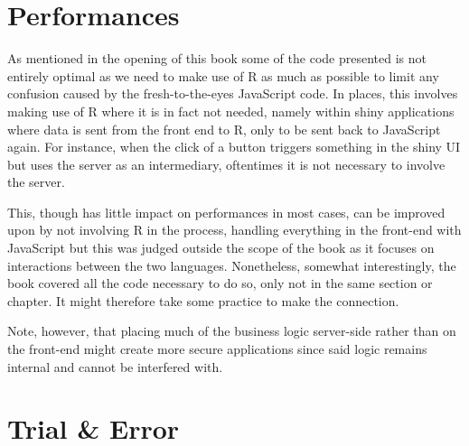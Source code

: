 \documentclass[
]{krantz}
\makeatletter
\newenvironment{Shaded}{\begin{snugshade}}{\end{snugshade}}
\newcommand{\AttributeTok}[1]{\textcolor[rgb]{0.61,0.61,0.61}{#1}}
\newcommand{\CommentTok}[1]{\textcolor[rgb]{0.37,0.37,0.37}{\textit{#1}}}
\newcommand{\KeywordTok}[1]{\textcolor[rgb]{0.27,0.27,0.27}{\textbf{#1}}}
\newcommand{\NormalTok}[1]{#1}
\newcommand{\OperatorTok}[1]{\textcolor[rgb]{0.43,0.43,0.43}{\textbf{#1}}}
\newcommand{\StringTok}[1]{\textcolor[rgb]{0.5,0.5,0.5}{#1}}
\newenvironment{kframe}{%
\medskip{}
\setlength{\fboxsep}{.8em}
 \def\at@end@of@kframe{}%
 \ifinner\ifhmode%
  \def\at@end@of@kframe{\end{minipage}}%
  \begin{minipage}{\columnwidth}%
 \fi\fi%
 \def\FrameCommand##1{\hskip\@totalleftmargin \hskip-\fboxsep
 \colorbox{shadecolor}{##1}\hskip-\fboxsep
     \hskip-\linewidth \hskip-\@totalleftmargin \hskip\columnwidth}%
 \MakeFramed {\advance\hsize-\width
   \@totalleftmargin\z@ \linewidth\hsize
   \@setminipage}}%
 {\par\unskip\endMakeFramed%
 \at@end@of@kframe}
\renewenvironment{Shaded}{\begin{kframe}}{\end{kframe}}
\makeatother
\begin{document}
\hypertarget{conclusion-performances}{%
\section{Performances}\label{conclusion-performances}}

As mentioned in the opening of this book some of the code presented is not entirely optimal as we need to make use of R as much as possible to limit any confusion caused by the fresh-to-the-eyes JavaScript code. In places, this involves making use of R where it is in fact not needed, namely within shiny applications where data is sent from the front end to R, only to be sent back to JavaScript again. For instance, when the click of a button triggers something in the shiny UI but uses the server as an intermediary, oftentimes it is not necessary to involve the server.

This, though has little impact on performances in most cases, can be improved upon by not involving R in the process, handling everything in the front-end with JavaScript but this was judged outside the scope of the book as it focuses on interactions between the two languages. Nonetheless, somewhat interestingly, the book covered all the code necessary to do so, only not in the same section or chapter. It might therefore take some practice to make the connection.

\begin{Shaded}
\end{Shaded}

Note, however, that placing much of the business logic server-side rather than on the front-end might create more secure applications since said logic remains internal and cannot be interfered with.

\hypertarget{conclusion-trial-and-error}{%
\section{Trial \& Error}\label{conclusion-trial-and-error}}
\end{document}
